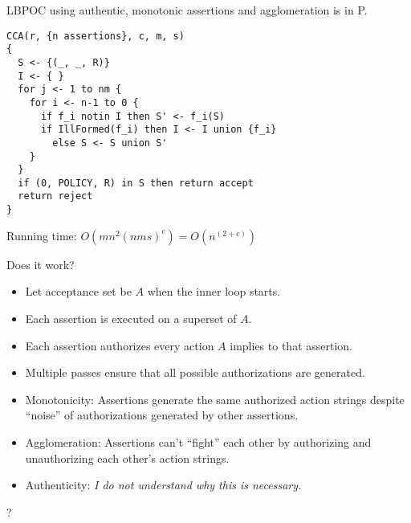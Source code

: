 \documentclass[landscape]{slides}
\begin{document}
LBPOC using authentic, monotonic assertions and agglomeration is in P.

\stopslide

\begin{verbatim}
CCA(r, {n assertions}, c, m, s)
{
  S <- {(_, _, R)}
  I <- { }
  for j <- 1 to nm {
    for i <- n-1 to 0 {
      if f_i notin I then S' <- f_i(S)
      if IllFormed(f_i) then I <- I union {f_i}
        else S <- S union S'
    }
  }
  if (0, POLICY, R) in S then return accept
  return reject
}
\end{verbatim}
\stopslide


Running time: $O(mn^2(nms)^c) = O(n^{(2+c)})$

Does it work?
\begin{itemize}
\item Let acceptance set be $A$ when the inner loop starts.
\item Each assertion is executed on a superset of $A$.
\item Each assertion authorizes every action $A$ implies to that assertion.
\item Multiple passes ensure that all possible authorizations are generated.
\end{itemize}

\stopslide

\begin{itemize}
\item Monotonicity: Assertions generate the same authorized action strings despite ``noise'' of authorizations generated by other assertions.
\item Agglomeration: Assertions can't ``fight'' each other by authorizing and unauthorizing each other's action strings.
\item Authenticity: \textit{I do not understand why this is necessary.}
\end{itemize}

\stopslide

\begin{center}\Large ?\end{center}
\stopslide
\end{document}
